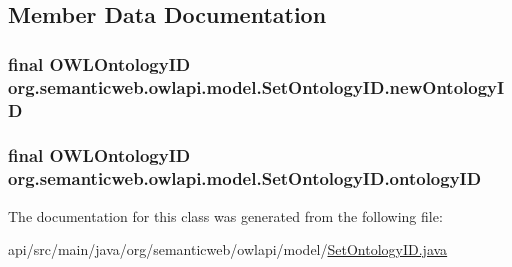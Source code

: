 \subsection{Member Data Documentation}
\hypertarget{classorg_1_1semanticweb_1_1owlapi_1_1model_1_1_set_ontology_i_d_af8ef5904a434fd37de0b1ffc71423ae1}{
\subsubsection[{new\-Ontology\-I\-D}]{\setlength{\rightskip}{0pt plus 5cm}final {\bf O\-W\-L\-Ontology\-I\-D} org.\-semanticweb.\-owlapi.\-model.\-Set\-Ontology\-I\-D.\-new\-Ontology\-I\-D\hspace{0.3cm}{\ttfamily [private]}}}\label{classorg_1_1semanticweb_1_1owlapi_1_1model_1_1_set_ontology_i_d_af8ef5904a434fd37de0b1ffc71423ae1}
\hypertarget{classorg_1_1semanticweb_1_1owlapi_1_1model_1_1_set_ontology_i_d_a632351a7e9ea2b61edc290f5c2adf57f}{
\subsubsection[{ontology\-I\-D}]{\setlength{\rightskip}{0pt plus 5cm}final {\bf O\-W\-L\-Ontology\-I\-D} org.\-semanticweb.\-owlapi.\-model.\-Set\-Ontology\-I\-D.\-ontology\-I\-D\hspace{0.3cm}{\ttfamily [private]}}}\label{classorg_1_1semanticweb_1_1owlapi_1_1model_1_1_set_ontology_i_d_a632351a7e9ea2b61edc290f5c2adf57f}


The documentation for this class was generated from the following file\-:\begin{DoxyCompactItemize}
\item 
api/src/main/java/org/semanticweb/owlapi/model/\hyperlink{_set_ontology_i_d_8java}{Set\-Ontology\-I\-D.\-java}\end{DoxyCompactItemize}
